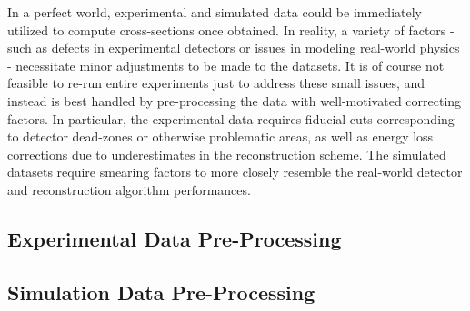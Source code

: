 
In a perfect world, experimental and simulated data could be immediately utilized to compute cross-sections once obtained. In reality, a variety of factors - such as defects in experimental detectors or issues in modeling real-world physics - necessitate minor adjustments to be made to the datasets. It is of course not feasible to re-run entire experiments just to address these small issues, and instead is best handled by pre-processing the data with well-motivated correcting factors.  In particular, the experimental data requires fiducial cuts corresponding to detector dead-zones or otherwise problematic areas, as well as energy loss corrections due to underestimates in the reconstruction scheme. The simulated datasets require smearing factors to more closely resemble the real-world detector and reconstruction algorithm performances.


\subsection{Experimental Data Pre-Processing}\label{sec:momcorr}
     
     
\subsection{Simulation Data Pre-Processing}\label{sec:momsmear}
   




